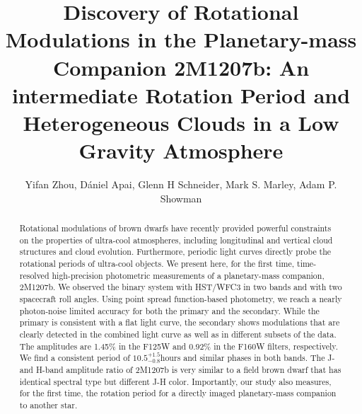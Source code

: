 \documentclass[apj]{emulateapj}
\newcommand{\period}{$10.5^{+1.5}_{-0.8}$}
\begin{document}
\title{Discovery of Rotational Modulations in the Planetary-mass
  Companion 2M1207\lowercase{b}: An intermediate Rotation Period and Heterogeneous Clouds in a Low
  Gravity Atmosphere}
\author{Yifan Zhou, D\'aniel Apai,
  Glenn H Schneider,  Mark S. Marley,
  Adam P. Showman}


\begin{abstract}
  Rotational modulations of brown dwarfs have recently provided
  powerful constraints on the properties of ultra-cool atmospheres,
  including longitudinal and vertical cloud structures and cloud
  evolution. Furthermore, periodic light curves directly probe the
  rotational periods of ultra-cool objects.  We present here, for the
  first time, time-resolved high-precision photometric measurements of
  a planetary-mass companion, 2M1207b.  We observed the binary
  system with HST/WFC3 in two bands and with two spacecraft roll
  angles. Using point spread function-based photometry, we reach a
  nearly photon-noise limited accuracy for both the primary and the
  secondary. While the primary is consistent with a flat light curve,
  the secondary shows modulations that are clearly detected in the
  combined light curve as well as in different subsets of the data.
  The amplitudes are 1.45\% in the F125W and 0.92\% in the F160W
  filters, respectively. We find a consistent period of
\period hours and
  similar phases in both bands. The J- and H-band amplitude ratio of
  2M1207b is very similar to a field brown dwarf that has identical
  spectral type but different J-H color.  Importantly, our study also
  measures, for the first time, the rotation period for a directly 
  imaged planetary-mass companion to another star.
\end{abstract}

\maketitle
%
\end{document}
